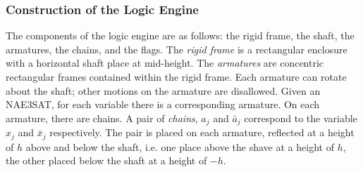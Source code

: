 \subsubsection{Construction of the Logic Engine}
The components of the logic engine are as follows: the rigid frame, the shaft, the armatures, 
the chains, and the flags.  The \textit{rigid frame} is a rectangular enclosure with a horizontal 
shaft place at mid-height.  The \textit{armatures} are concentric rectangular frames contained 
within the rigid frame.  Each armature can rotate about the shaft; other motions on the armature 
are disallowed.  Given an NAE3SAT, for each variable there is a corresponding armature. On each 
armature, there are chains.  A pair of \textit{chains}, $a_j$ and $\bar{a}_j$ correspond to the 
variable $x_j$ and $\bar{x}_j$ respectively.  The pair is placed on each armature, reflected at a 
height of $h$ above and below the shaft, i.e. one place above the shave at a height of $h$, the 
other placed below the shaft at a height of $-h$.


